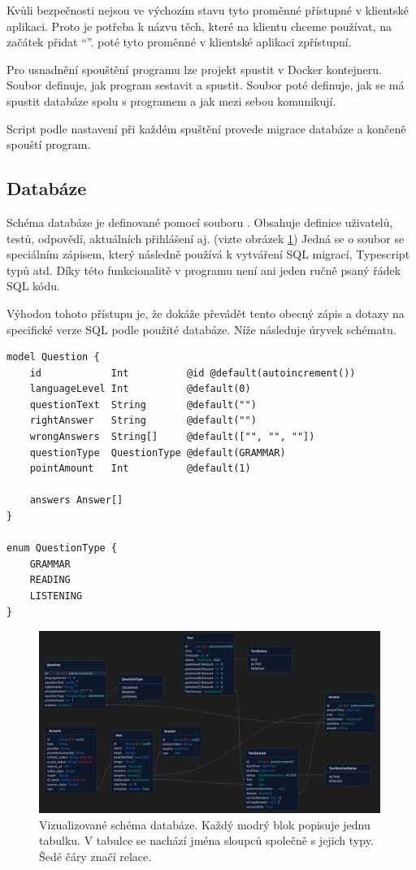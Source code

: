 Kvůli bezpečnosti nejsou ve výchozím stavu tyto proměnné přístupné v klientské aplikaci. Proto je potřeba k názvu těch, které na klientu chceme používat, na začátek přidat \enquote{}.  poté tyto proměnné v klientské aplikaci zpřístupní.

Pro usnadnění spouštění programu lze projekt spustit v Docker kontejneru. Soubor  definuje, jak program sestavit a spustit. Soubor  poté definuje, jak se má spustit databáze spolu s programem a jak mezi sebou komunikují. \cite{docker}

Script  podle nastavení při každém spuštění provede migrace databáze a končeně spouští program.

\subsection{Databáze}

Schéma databáze je definované pomocí souboru . Obsahuje definice uživatelů, testů, odpovědí, aktuálních přihlášení aj. (vizte obrázek \ref{schema}) Jedná se o soubor se speciálním zápisem, který následně  používá k vytváření SQL migrací, Typescript typů atd. Díky této funkcionalitě v programu není ani jeden ručně psaný řádek SQL kódu.

Výhodou tohoto přístupu je, že  dokáže převádět tento obecný zápis a dotazy na specifické verze SQL podle použité databáze. \cite{prisma} Níže následuje úryvek schématu.

\begin{lstlisting}[language=Prisma, caption={Úryvek schéma databáze}]
model Question {
    id            Int          @id @default(autoincrement())
    languageLevel Int          @default(0)
    questionText  String       @default("")
    rightAnswer   String       @default("")
    wrongAnswers  String[]     @default(["", "", ""])
    questionType  QuestionType @default(GRAMMAR)
    pointAmount   Int          @default(1)

    answers Answer[]
}

enum QuestionType {
    GRAMMAR
    READING
    LISTENING
}
\end{lstlisting}

\begin{figure}[H]
    \centering
    \includegraphics[width=420px]{images/02technologie/schema.png}
    \caption{Vizualizované schéma databáze. Každý modrý blok popisuje jednu tabulku. V tabulce se nachází jména sloupců společně s jejich typy. Šedé čáry značí relace.}
    \label{schema}
\end{figure}

